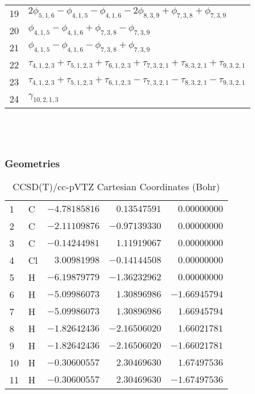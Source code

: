 \documentclass[10pt,oneside]{article}
\begin{document}
\begin{table}[h!]
\begin{tabular}{ll}
  19  & $2\phi_{5,1,6} - \phi_{4,1,5} - \phi_{4,1,6} - 2\phi_{8,3,9} + \phi_{7,3,8} + \phi_{7,3,9}$ \\
  20  & $\phi_{4,1,5} - \phi_{4,1,6} + \phi_{7,3,8} - \phi_{7,3,9}$ \\
  21  & $\phi_{4,1,5} - \phi_{4,1,6} - \phi_{7,3,8} + \phi_{7,3,9}$ \\
  22  & $\tau_{4,1,2,3} + \tau_{5,1,2,3} + \tau_{6,1,2,3} + \tau_{7,3,2,1} + \tau_{8,3,2,1} + \tau_{9,3,2,1}$ \\
  23  & $\tau_{4,1,2,3} + \tau_{5,1,2,3} + \tau_{6,1,2,3} - \tau_{7,3,2,1} - \tau_{8,3,2,1} - \tau_{9,3,2,1}$ \\
  24  & $\gamma_{10,2,1,3}$ \\
\end{tabular}
\end{table}

\clearpage

\subsection{\ \ \ }

\subsubsection*{Geometries}
\begin{table}[h!]
\centering
\caption{CCSD(T)/cc-pVTZ Cartesian Coordinates (Bohr)}
\begin{tabular}{llrrr}
1  & C  & $-4.78185816$ & $ 0.13547591$ & $ 0.00000000$ \\
2  & C  & $-2.11109876$ & $-0.97139330$ & $ 0.00000000$ \\
3  & C  & $-0.14244981$ & $ 1.11919067$ & $ 0.00000000$ \\
4  & Cl & $ 3.00981998$ & $-0.14144508$ & $ 0.00000000$ \\
5  & H  & $-6.19879779$ & $-1.36232962$ & $ 0.00000000$ \\
6  & H  & $-5.09986073$ & $ 1.30896986$ & $-1.66945794$ \\
7  & H  & $-5.09986073$ & $ 1.30896986$ & $ 1.66945794$ \\
8  & H  & $-1.82642436$ & $-2.16506020$ & $ 1.66021781$ \\
9  & H  & $-1.82642436$ & $-2.16506020$ & $-1.66021781$ \\
10 & H  & $-0.30600557$ & $ 2.30469630$ & $ 1.67497536$ \\
11 & H  & $-0.30600557$ & $ 2.30469630$ & $-1.67497536$ \\
\end{tabular}
\end{table}
\end{document}
